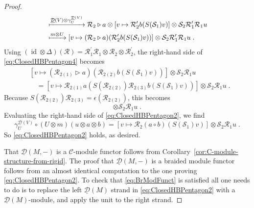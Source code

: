 \documentclass[12pt,dvipsnames]{article}
\numberwithin{equation}{section}
\theoremstyle{definition}
\newcommand{\cat}[1]{\mathcal{#1}}
\newcommand{\1}{\ensuremath{\mathbbm{1}}}
\DeclareMathOperator{\Id}{id}
\newcommand{\blank}{{-}}
\begin{document}
\begin{proof}
\begin{align}
        &\xmapsto{\underline{\cat{D}}(V)\otimes\gamma_U^{\underline{\cat{D}}(V)}}  \mathcal{R}_2\triangleright a\otimes [v\mapsto\mathcal{R}_2^\prime b(S(\mathcal{S}_1)v)]\otimes \mathcal{S}_2\mathcal{R}_1^\prime\mathcal{R}_1 u \nonumber\\
        &\xmapsto{m\otimes U} [v\mapsto (\mathcal{R}_2\triangleright a)(\mathcal{R}_2^\prime b(S(\mathcal{S}_1)v))]\otimes \mathcal{S}_2\mathcal{R}_1^\prime\mathcal{R}_1 u \;.
    \end{align}
    Using $(\Id\otimes\Delta)(\mathcal{R}) = \mathcal{R}_1^\prime\mathcal{R}_1\otimes\mathcal{R}_2\otimes\mathcal{R}_2^\prime$, the right-hand side of \eqref{eq:ClosedHBPentagon4} becomes
    \begin{equation}
        \begin{aligned}
        &[v \mapsto(\mathcal{R}_{2(1)} \triangleright a)(\mathcal{R}_{2(2)} b(S(\mathcal{S}_1)v))]\otimes \mathcal{S}_2\mathcal{R}_1 u
        \\&\quad =[v \mapsto\mathcal{R}_{2(1)}a(S(\mathcal{R}_{2(2)})\mathcal{R}_{2(3)}b(S(\mathcal{S}_1)v))]\otimes \mathcal{S}_2\mathcal{R}_1 u \;.
        \end{aligned}
    \end{equation}
    Because $S(\mathcal{R}_{2(2)})\mathcal{R}_{2(3)} = \epsilon(\mathcal{R}_{2(2)})$, this becomes
    \begin{equation}
        [v\mapsto \mathcal{R}_2 (a\circ b)(S(\mathcal{S}_1)v)]\otimes \mathcal{S}_2\mathcal{R}_1 u \;.
    \end{equation}
    Evaluating the right-hand side of \eqref{eq:ClosedHBPentagon2}, we find
    \begin{equation}
        \gamma^{\underline{\cat{D}}(V)}_U\circ(U\otimes m)(u\otimes a\otimes b) = [v\mapsto \mathcal{R}_2 (a\circ b)(S(\mathcal{S}_1)v)]\otimes \mathcal{S}_2\mathcal{R}_1 u \;.
    \end{equation}
    So \eqref{eq:ClosedHBPentagon2} holds, as desired.
    
    That $\underline{\cat{D}}(M,\blank)$ is a $\cat{C}$-module functor follows from Corollary~\ref{cor:C-module-structure-from-rigid}. The proof that $\underline{\cat{D}}(M,\blank)$ is a braided module functor follows from an almost identical computation to the one proving \eqref{eq:ClosedHBPentagon2}. To check that \eqref{eq:BrModFunct} is satisfied all one needs to do is to replace the left $\underline{\cat{D}}(M)$ strand in \eqref{eq:ClosedHBPentagon2} with a $\underline{\cat{D}}(M)$-module, and apply the unit to the right strand.
\end{proof}
\end{document}
